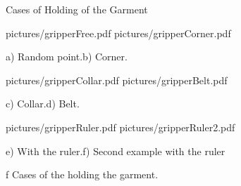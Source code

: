 \app Cases of Holding of the Garment


\medskip {}
\picw=7cm 
\centerline {\inspic pictures/gripperFree.pdf \hfil\hfil \inspic pictures/gripperCorner.pdf }\nobreak
\centerline {a) Random point.\hfil\hfil b) Corner.}\nobreak\medskip
\centerline {\inspic pictures/gripperCollar.pdf \hfil\hfil \inspic pictures/gripperBelt.pdf }\nobreak
\centerline {c) Collar.\hfil\hfil d) Belt.}\nobreak\medskip
\centerline {\inspic pictures/gripperRuler.pdf \hfil\hfil \inspic pictures/gripperRuler2.pdf }\nobreak
\centerline {e) With the ruler.\hfil\hfil f) Second example with the ruler}\nobreak\medskip
\caption/f Cases of the holding the garment.
\medskip
